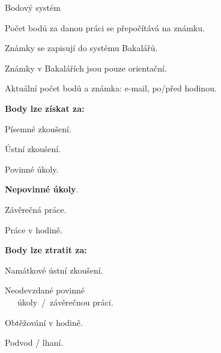 \documentclass[aspectratio=169]{beamer}
\begin{document}
\begin{frame}{Bodový systém}
    \begin{cardTiny}
        \begin{flushleft}
            Počet bodů za danou práci se přepočítává na známku.

            Známky se zapisují do systému Bakalářů.

            Známky v Bakalářích jsou pouze orientační.

            Aktuální počet bodů a známka: e-mail, po/před hodinou.
        \end{flushleft}
    \end{cardTiny}
    \begin{multicols}{2}
        \centering
        
        \begin{cardTiny}
            \textbf{Body lze získat za:}
        
            \begin{flushleft}
            Písemné zkoušení.

            Ústní zkoušení.

            Povinné úkoly.

            \textbf{Nepovinné úkoly}.

            Závěrečná práce.

            Práce v hodině.
            \end{flushleft}
        \end{cardTiny}
        
        \begin{cardTiny}
            \textbf{Body lze ztratit za:}
            
            \begin{flushleft}
            Namátkové ústní zkoušení.

            Neodevzdané povinné\\~~~úkoly~/~závěrečnou práci.

            Obtěžování v hodině.

            Podvod / lhaní.
            \end{flushleft}
        \end{cardTiny}
    \end{multicols}
\end{frame}
\end{document}
